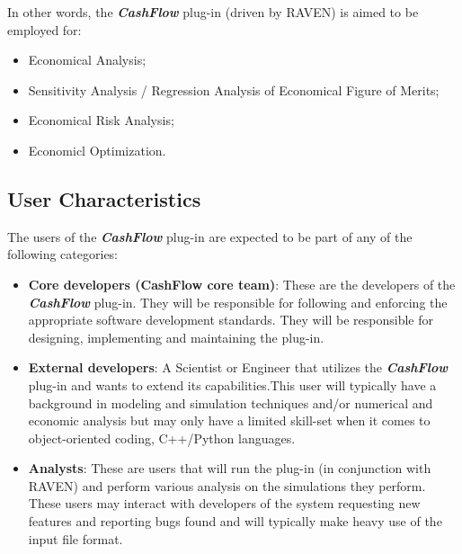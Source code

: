 In other words, the  \textbf{\textit{CashFlow}} plug-in (driven by RAVEN) is aimed to be employed for:
\begin{itemize}
  \item Economical Analysis;
  \item Sensitivity Analysis / Regression Analysis of Economical Figure of Merits;
  \item Economical Risk Analysis;
  \item Economicl Optimization.
\end{itemize}


\subsection{User Characteristics}

The users of the \textbf{\textit{CashFlow}} plug-in are expected to be part of any of the
following categories:
\begin{itemize}
  \item \textbf{Core developers (CashFlow core team)}: These are the developers of the \textbf{\textit{CashFlow}}  plug-in. They will be responsible for following
    and enforcing the appropriate software development standards. They will be responsible for designing, implementing and 
    maintaining the plug-in.
  \item \textbf{External developers}: A Scientist or Engineer that utilizes the \textbf{\textit{CashFlow}}  plug-in and wants to extend its 
  capabilities.This user will typically have a background in modeling and 
simulation techniques and/or numerical and economic analysis but may only have a limited skill-set when it comes to object-oriented 
coding, C++/Python languages.
  \item \textbf{Analysts}:  These are users that will run the plug-in (in conjunction with RAVEN) and perform various analysis on the 
  simulations they perform. These users may interact with developers of the system requesting new features and reporting bugs found 
  and will typically make heavy use of the input file format.
\end{itemize}
